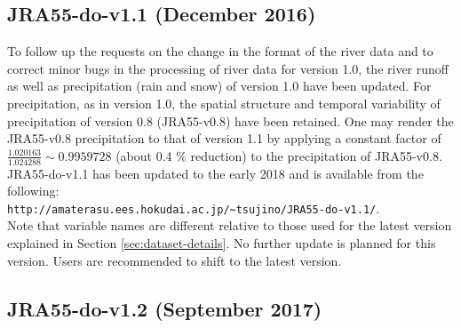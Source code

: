 \documentclass[dvipdfmx]{elsarticle_mod}
\begin{document}
\subsection{JRA55-do-v1.1 (December 2016)}

To follow up the requests on the change in the format of the river data and to correct minor bugs in the processing of river data for version 1.0, the river runoff as well as precipitation (rain and snow) of version 1.0 have been updated. For precipitation, as in version 1.0, the spatial structure and temporal variability of precipitation of version 0.8 (JRA55-v0.8) have been retained. One may render the JRA55-v0.8 precipitation to that of version 1.1 by applying a constant factor of $\frac{1.020163}{1.024288} \sim 0.9959728$ (about 0.4 \% reduction) to the precipitation of JRA55-v0.8. JRA55-do-v1.1 has been updated to the early 2018 and is available from the following:\\
\hspace*{3zw} \texttt{http://amaterasu.ees.hokudai.ac.jp/\~{}tsujino/JRA55-do-v1.1/}.\\
Note that variable names are different relative to those used for the latest version explained in Section \ref{sec:dataset-details}. No further update is planned for this version. Users are recommended to shift to the latest version.



\subsection{JRA55-do-v1.2 (September 2017)}

\label{app:version_1_2}
\end{document}
